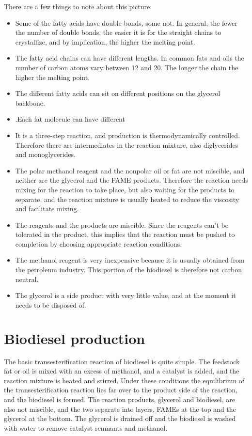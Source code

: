 There are a few things to note about this picture:
\begin{itemize}
	\item Some of the fatty acids have double bonds, some not. In general, the fewer the number of double bonds, the easier it is for the straight chains to crystallize, and by implication, the higher the melting point. 
	\item The fatty acid chains can have different lengths. In common fats and oils the number of carbon atoms vary between 12 and 20. The longer the chain the higher the melting point.
	\item The different fatty acids can sit on different positions on the glycerol backbone.
	\item.Each fat molecule can have different 
	\item It is a three-step reaction, and production is thermodynamically controlled. Therefore there are intermediates in the reaction mixture, also diglycerides and monoglycerides.
	\item The polar methanol reagent and the nonpolar oil or fat are not miscible, and neither are the glycerol and the FAME products. Therefore the reaction needs mixing for the reaction to take place, but also waiting for the products to separate, and the reaction mixture is usually heated to reduce the viscosity and facilitate mixing. 
	\item The reagents and the products are miscible. Since the reagents can't be tolerated in the product, this implies that the reaction must be pushed to completion by choosing appropriate reaction conditions. 
	\item The methanol reagent is very inexpensive because it is usually obtained from the petroleum industry. This portion of the biodiesel is therefore not carbon neutral. 
	\item The glycerol is a side product with very little value, and at the moment it needs to be disposed of. 
\end{itemize}



\section{Biodiesel production}

The basic transesterification reaction of biodiesel is quite simple. The feedstock fat or oil is mixed with an excess of methanol, and a catalyst is added, and the reaction mixture is heated and stirred. Under these conditions the equilibrium of the transesterification reaction lies far over to the product side of the reaction, and the biodiesel is formed. The reaction products, glycerol and biodiesel, are also not miscible, and the two separate into layers, FAMEs at the top and the glycerol at the bottom. The glycerol is drained off and the biodiesel is washed with water to remove catalyst remnants and methanol. 

